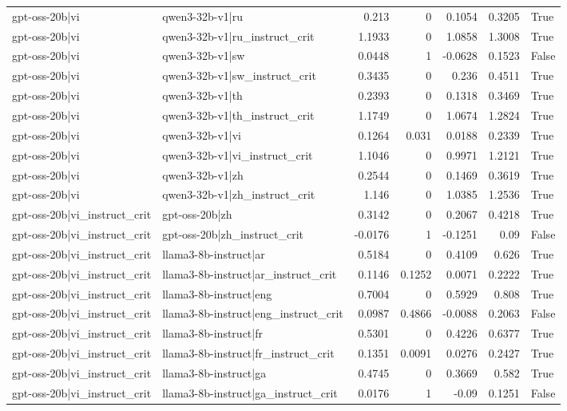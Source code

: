 \begin{table}
\begin{tabular}{l l r r r r l}
gpt-oss-20b|vi & qwen3-32b-v1|ru & 0.213 & 0 & 0.1054 & 0.3205 & True \\
gpt-oss-20b|vi & qwen3-32b-v1|ru_instruct_crit & 1.1933 & 0 & 1.0858 & 1.3008 & True \\
gpt-oss-20b|vi & qwen3-32b-v1|sw & 0.0448 & 1 & -0.0628 & 0.1523 & False \\
gpt-oss-20b|vi & qwen3-32b-v1|sw_instruct_crit & 0.3435 & 0 & 0.236 & 0.4511 & True \\
gpt-oss-20b|vi & qwen3-32b-v1|th & 0.2393 & 0 & 0.1318 & 0.3469 & True \\
gpt-oss-20b|vi & qwen3-32b-v1|th_instruct_crit & 1.1749 & 0 & 1.0674 & 1.2824 & True \\
gpt-oss-20b|vi & qwen3-32b-v1|vi & 0.1264 & 0.031 & 0.0188 & 0.2339 & True \\
gpt-oss-20b|vi & qwen3-32b-v1|vi_instruct_crit & 1.1046 & 0 & 0.9971 & 1.2121 & True \\
gpt-oss-20b|vi & qwen3-32b-v1|zh & 0.2544 & 0 & 0.1469 & 0.3619 & True \\
gpt-oss-20b|vi & qwen3-32b-v1|zh_instruct_crit & 1.146 & 0 & 1.0385 & 1.2536 & True \\
gpt-oss-20b|vi_instruct_crit & gpt-oss-20b|zh & 0.3142 & 0 & 0.2067 & 0.4218 & True \\
gpt-oss-20b|vi_instruct_crit & gpt-oss-20b|zh_instruct_crit & -0.0176 & 1 & -0.1251 & 0.09 & False \\
gpt-oss-20b|vi_instruct_crit & llama3-8b-instruct|ar & 0.5184 & 0 & 0.4109 & 0.626 & True \\
gpt-oss-20b|vi_instruct_crit & llama3-8b-instruct|ar_instruct_crit & 0.1146 & 0.1252 & 0.0071 & 0.2222 & True \\
gpt-oss-20b|vi_instruct_crit & llama3-8b-instruct|eng & 0.7004 & 0 & 0.5929 & 0.808 & True \\
gpt-oss-20b|vi_instruct_crit & llama3-8b-instruct|eng_instruct_crit & 0.0987 & 0.4866 & -0.0088 & 0.2063 & False \\
gpt-oss-20b|vi_instruct_crit & llama3-8b-instruct|fr & 0.5301 & 0 & 0.4226 & 0.6377 & True \\
gpt-oss-20b|vi_instruct_crit & llama3-8b-instruct|fr_instruct_crit & 0.1351 & 0.0091 & 0.0276 & 0.2427 & True \\
gpt-oss-20b|vi_instruct_crit & llama3-8b-instruct|ga & 0.4745 & 0 & 0.3669 & 0.582 & True \\
gpt-oss-20b|vi_instruct_crit & llama3-8b-instruct|ga_instruct_crit & 0.0176 & 1 & -0.09 & 0.1251 & False \\

\end{tabular}
\end{table}

